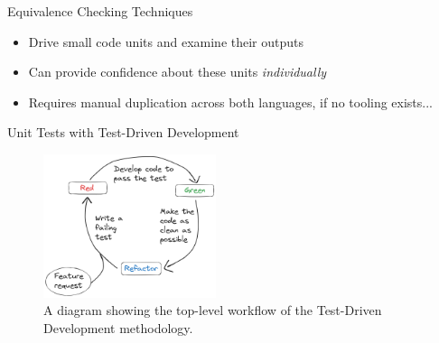 \documentclass[10pt,aspectratio=169]{beamer}
\begin{document}
\begin{frame}{Equivalence Checking Techniques}
\begin{itemize}
\begin{enumerate}
\begin{itemize}
                \item Drive small code units and examine their outputs
                \item Can provide confidence about these units \textit{individually}
                \item Requires manual duplication across both languages, if no tooling exists...
            \end{itemize}
        \end{enumerate}
    \end{itemize}
\end{frame}

\begin{frame}{Unit Tests with Test-Driven Development}
    \begin{figure}[H]
        \hspace*{-1cm}
        \includegraphics[width=0.45\textwidth]{images/excalidraw_tdd.png}
        \caption{A diagram showing the top-level workflow of the Test-Driven Development methodology.}
        \label{fig:tdd_workflow}
    \end{figure}
\end{frame}
\end{document}

